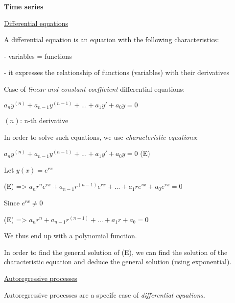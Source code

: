 {\fontsize{12pt}{22pt} \textbf{Time series}\par}

\vspace{5mm}

\underline{Differential equations}

\vspace{5mm}

A differential equation is an equation with the following characteristics:

- variables = functions

- it expresses the relationship of functions (variables) with their derivatives

\vspace{5mm}

Case of \textit{linear and constant coefficient} differential equations:

\vspace{5mm}

\begin{center}
$a_ny^{(n)} + a_{n-1}y^{(n-1)} + ... + a_1y' + a_0y = 0$
\end{center}

$(n)$: n-th derivative

\vspace{5mm}

In order to solve such equations, we use \textit{characteristic equations}:

$a_ny^{(n)} + a_{n-1}y^{(n-1)} + ... + a_1y' + a_0y = 0$ (E)

Let $y(x) = e^{rx}$

(E) => $a_nr^n e^{rx} + a_{n-1}r^{(n-1)} e^{rx} + ... + a_1 r e^{rx} + a_0e^{rx} = 0$

Since $e^{rx} \neq 0$

(E) => $a_nr^n + a_{n-1}r^{(n-1)} + ... + a_1 r + a_0 = 0$

We thus end up with a polynomial function.

In order to find the general solution of (E), we can find the solution of the characteristic equation and deduce the general solution (using exponential).

\vspace{5mm}

\underline{Autoregressive processes}

\vspace{5mm}

Autoregressive processes are a specifc case of \textit{differential equations}.

\vspace{5mm}

